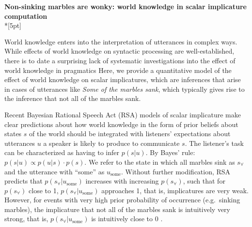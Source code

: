 \documentclass[11pt]{article}
\begin{document}
\begin{center}\textbf{Non-sinking marbles are wonky: world knowledge in  scalar implicature computation}\\*[5pt]
\end{center}

\vspace{-11pt}

World knowledge enters into the interpretation of utterances in complex ways. %
While effects of world knowledge on syntactic processing are well-established, there is to date a surprising lack of systematic investigations into the effect of world knowledge in pragmatics%
Here, we provide a quantitative model of the effect of world knowledge  on  scalar implicatures, which are inferences that arise in cases of utterances like \textit{Some of the marbles sank}, %
which typically gives rise to the inference that not all of the marbles sank.%


Recent Bayesian Rational Speech Act (RSA)  models of scalar implicature \cite{frank2012} make clear predictions about how world knowledge in the form of prior beliefs about states $s$ of the world should be integrated with listeners' expectations about utterances $u$ a speaker is likely to produce to communicate $s$. The listener's task can be characterized as having to infer $p(s|u)$. By Bayes' rule: $p(s|u)\propto p(u|s)\cdot p(s)$. We refer to the state in which all marbles sink as $s_{\forall}$ and the utterance with ``some'' as $u_{\textrm{some}}$. Without further modification, RSA predicts that $p(s_{\forall}|u_{\textrm{some}})$ increases with increasing $p(s_{\forall})$, such that for $p(s_{\forall})$ close to 1, $p(s_{\forall}|u_{\textrm{some}})$ approaches 1, that is, implicatures are very weak. However, for events with very high prior probability of occurrence (e.g.~sinking marbles), the implicature that not all of the marbles sank is intuitively very strong, that is, $p(s_{\forall}|u_{\textrm{some}})$ is intuitively close to 0 \cite{geurts2010}. 
\end{document}

